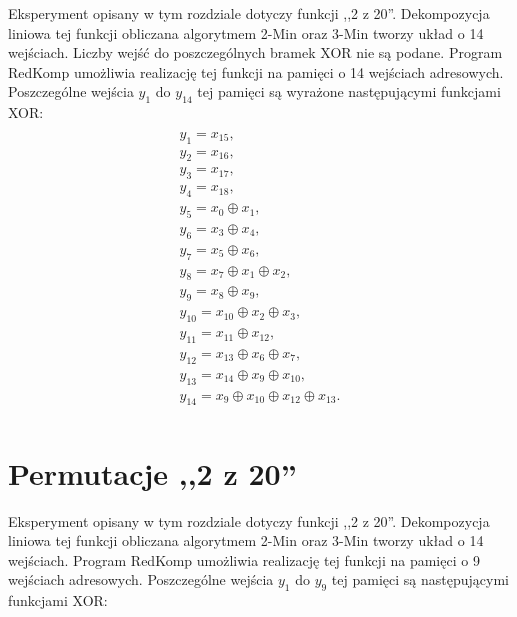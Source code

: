 Eksperyment opisany w tym rozdziale dotyczy funkcji ,,2 z 20''.
Dekompozycja liniowa tej funkcji obliczana algorytmem 2-Min oraz 3-Min \cite{sasao-s-min} tworzy układ o 14 wejściach.
Liczby wejść do poszczególnych bramek XOR nie są podane.
Program RedKomp umożliwia realizację tej funkcji na pamięci o 14 wejściach adresowych.
Poszczególne wejścia $y_1$ do $y_{14}$ tej pamięci są wyrażone następującymi funkcjami XOR:
\begin{multline} \\
y_1 = x_{15}, \\
y_2 = x_{16}, \\
y_3 = x_{17}, \\
y_4 = x_{18}, \\
y_5 = x_0 \oplus x_1, \\
y_6 = x_3 \oplus x_4, \\
y_7 = x_5 \oplus x_6, \\
y_8 = x_7 \oplus x_1 \oplus x_2, \\
y_9 = x_8 \oplus x_9, \\
y_{10} = x_{10} \oplus x_2 \oplus x_3, \\
y_{11} = x_{11} \oplus x_{12}, \\
y_{12} = x_{13} \oplus x_6 \oplus x_7, \\
y_{13} = x_{14} \oplus x_9 \oplus x_{10}, \\
y_{14} = x_9 \oplus x_{10} \oplus x_{12} \oplus x_{13}. \\
\end{multline}

\section{Permutacje ,,2 z 20''}

Eksperyment opisany w tym rozdziale dotyczy funkcji ,,2 z 20''.
Dekompozycja liniowa tej funkcji obliczana algorytmem 2-Min oraz 3-Min \cite{sasao-s-min} tworzy układ o 14 wejściach.
Program RedKomp umożliwia realizację tej funkcji na pamięci o 9 wejściach adresowych.
Poszczególne wejścia $y_1$ do $y_9$ tej pamięci są następującymi funkcjami XOR:

